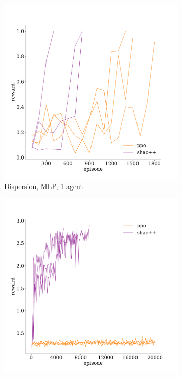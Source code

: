 \begin{figure}[t]
    \centering
    \begin{subfigure}[b]{0.32\textwidth}
        \includegraphics[width=\textwidth]{figs/dispersion-1-mlp.pdf}
        \caption{Dispersion, MLP, 1 agent}
        \label{fig:dispersion-mlp-1}
    \end{subfigure}
    \begin{subfigure}[b]{0.32\textwidth}
        \includegraphics[width=\textwidth]{figs/dispersion-3-transformer.pdf}

\end{subfigure}
\end{figure}

